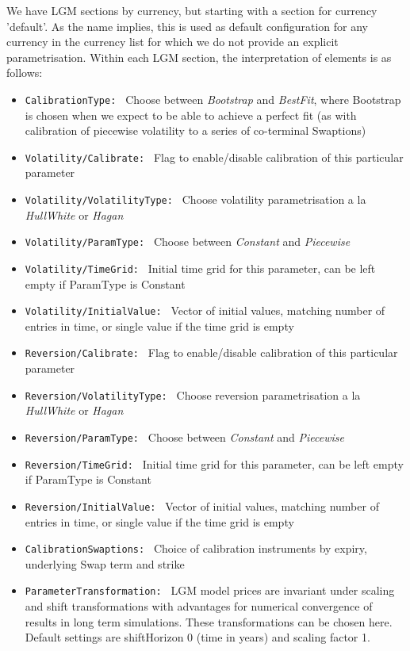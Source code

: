 \documentclass[12pt, a4paper]{article}
\begin{document}
{{We have LGM sections by currency, but starting with a section for currency 'default'. As the name implies, this is used
as default configuration for any currency in the currency list for which we do not provide an explicit
parametrisation. Within each LGM section, the interpretation of elements is as follows:

\begin{itemize}
\item {\tt CalibrationType: } Choose between {\em Bootstrap} and {\em BestFit}, where Bootstrap is chosen when we expect
to be able to achieve a perfect fit (as with calibration of piecewise volatility to a series of co-terminal Swaptions)
\item {\tt Volatility/Calibrate: } Flag to enable/disable calibration of this particular parameter
\item {\tt Volatility/VolatilityType: } Choose volatility parametrisation a la {\em HullWhite} or {\em Hagan}
\item {\tt Volatility/ParamType: } Choose between {\em Constant} and {\em Piecewise}
\item {\tt Volatility/TimeGrid: } Initial time grid for this parameter, can be left empty if ParamType is Constant
\item {\tt Volatility/InitialValue: } Vector of initial values, matching number of entries in time, or single value if
the time grid is empty
\item {\tt Reversion/Calibrate: } Flag to enable/disable calibration of this particular parameter
\item {\tt Reversion/VolatilityType: } Choose reversion parametrisation a la {\em HullWhite} or {\em Hagan}
\item {\tt Reversion/ParamType: } Choose between {\em Constant} and {\em Piecewise}
\item {\tt Reversion/TimeGrid: } Initial time grid for this parameter, can be left empty if ParamType is Constant
\item {\tt Reversion/InitialValue: } Vector of initial values, matching number of entries in time, or single value if
the time grid is empty
\item {\tt CalibrationSwaptions: } Choice of calibration instruments by expiry, underlying Swap term and strike
\item {\tt ParameterTransformation: } LGM model prices are invariant under scaling and shift transformations
\cite{Lichters} with advantages for numerical convergence of results in long term simulations. These transformations can
be chosen here. Default settings are shiftHorizon 0 (time in years) and scaling factor 1.
\end{itemize}

}}
\end{document}
